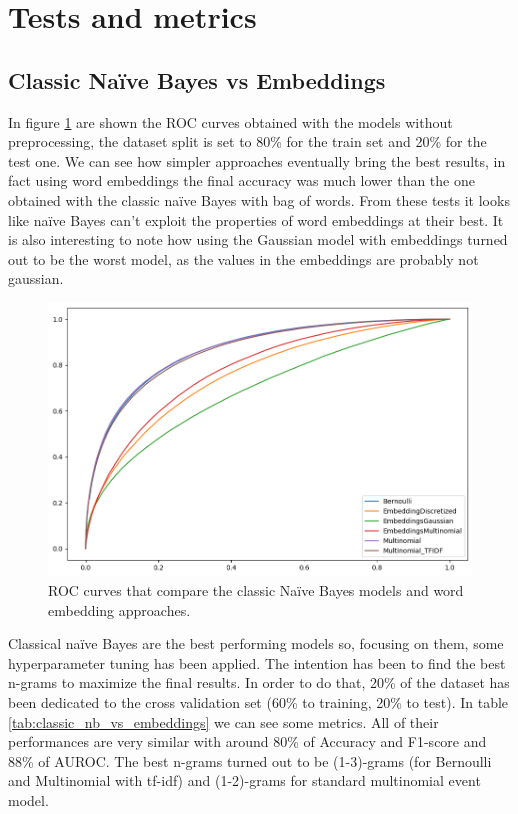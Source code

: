 \section*{Tests and metrics}

\subsection*{Classic Na\"ive Bayes vs Embeddings}

In figure \ref{fig:classic_nb_vs_embeddings} are shown the ROC curves obtained with the models without preprocessing, the dataset split is set to 80\% for the train set and 20\% for the test one.
We can see how simpler approaches eventually bring the best results, in fact using word embeddings the final accuracy was much lower than the one obtained with the classic na\"ive Bayes with bag of words. From these tests it looks like na\"ive Bayes can't exploit the properties of word embeddings at their best. It is also interesting to note how using the Gaussian model with embeddings turned out to be the worst model, as the values in the embeddings are probably not gaussian.

\begin{figure}[h!t]
    \centering
    \includegraphics[scale=0.50]{../experiments/plots/classic_nb_vs_embeddings}
    \caption{ROC curves that compare the classic Na\"ive Bayes models and
    word embedding approaches.}
    \label{fig:classic_nb_vs_embeddings}        
\end{figure}

Classical na\"ive Bayes are the best performing models so, focusing on them, some hyperparameter tuning has been applied. The intention has been to find the best n-grams to maximize the final results. In order to do that, 20\% of the dataset has been dedicated to the cross validation set (60\% to training, 20\% to test).
In table \ref{tab:classic_nb_vs_embeddings} we can see some metrics. 
All of their performances are very similar with around 80\% of Accuracy and F1-score and 88\% of AUROC. The best n-grams turned out to be (1-3)-grams (for Bernoulli and Multinomial with tf-idf) and (1-2)-grams for standard multinomial event model.

